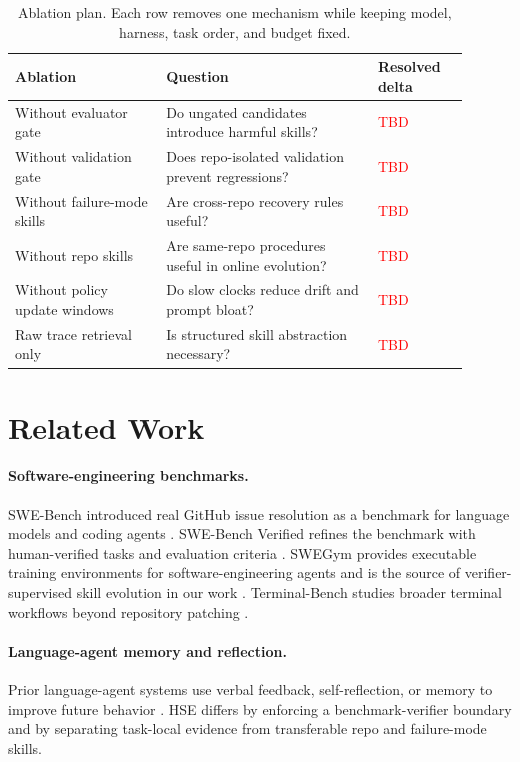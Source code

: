 \documentclass{article}
\newcommand{\method}{HSE}
\newcommand{\tbd}{\textcolor{red}{TBD}}
\begin{document}
\begin{table}[h]
\caption{Ablation plan. Each row removes one mechanism while keeping model,
harness, task order, and budget fixed.}
\label{tab:ablations}
\begin{center}
\begin{tabular}{L{0.30\linewidth} L{0.42\linewidth} C{0.18\linewidth}}
\toprule
Ablation & Question & Resolved delta \\
\midrule
Without evaluator gate & Do ungated candidates introduce harmful skills? & \tbd \\
Without validation gate & Does repo-isolated validation prevent regressions? & \tbd \\
Without failure-mode skills & Are cross-repo recovery rules useful? & \tbd \\
Without repo skills & Are same-repo procedures useful in online evolution? & \tbd \\
Without policy update windows & Do slow clocks reduce drift and prompt bloat? & \tbd \\
Raw trace retrieval only & Is structured skill abstraction necessary? & \tbd \\
\bottomrule
\end{tabular}
\end{center}
\end{table}

\section{Related Work}

\paragraph{Software-engineering benchmarks.}
SWE-Bench introduced real GitHub issue resolution as a benchmark for language
models and coding agents \citep{swebench2024}. SWE-Bench Verified refines the
benchmark with human-verified tasks and evaluation criteria
\citep{swebenchverified2024}. SWEGym provides executable training environments
for software-engineering agents and is the source of verifier-supervised skill
evolution in our work \citep{swegym2025}. Terminal-Bench studies broader
terminal workflows beyond repository patching \citep{terminalbench2025}.

\paragraph{Language-agent memory and reflection.}
Prior language-agent systems use verbal feedback, self-reflection, or memory to
improve future behavior \citep{react2023,reflexion2023,voyager2023}. \method{}
differs by enforcing a benchmark-verifier boundary and by separating
task-local evidence from transferable repo and failure-mode skills.
\end{document}
